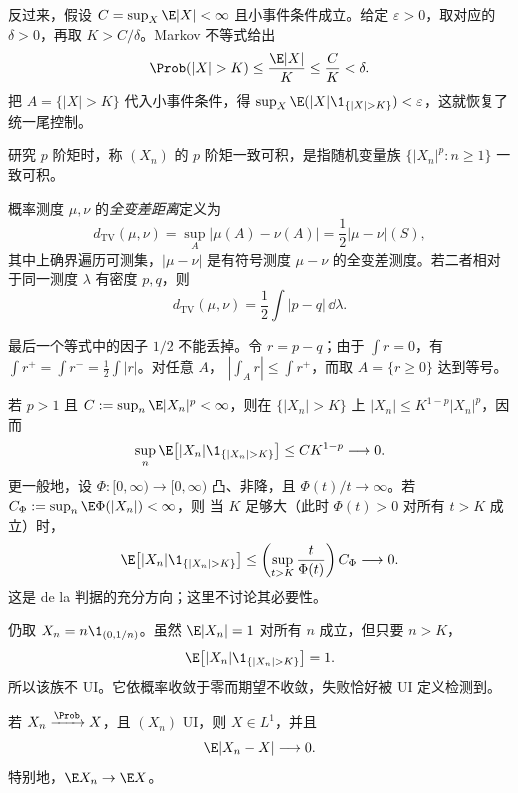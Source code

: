 反过来，假设 $C=\sup_X\E|X|<\infty$ 且小事件条件成立。给定 $\varepsilon>0$，取对应的
$\delta>0$，再取 $K>C/\delta$。Markov 不等式给出
\[
 \Prob(|X|>K)\le\frac{\E|X|}{K}\le\frac CK<\delta.
\]
把 $A=\{|X|>K\}$ 代入小事件条件，得
$\sup_X\E(|X|\1_{\{|X|>K\}})<\varepsilon$，这就恢复了统一尾控制。

\begin{definition}[矩一致可积]\label{def:5-3-2-2}
研究 $p$ 阶矩时，称 $(X_n)$ 的 $p$ 阶矩一致可积，是指随机变量族
$\{|X_n|^p:n\ge1\}$ 一致可积。
\end{definition}

\begin{definition}[全变差距离]\label{def:5-3-2-3}
概率测度 $\mu,\nu$ 的\emph{全变差距离}定义为
\[
 d_{\mathrm{TV}}(\mu,\nu)=\sup_A|\mu(A)-\nu(A)|
 =\frac12|\mu-\nu|(S),
\]
其中上确界遍历可测集，$|\mu-\nu|$ 是有符号测度 $\mu-\nu$ 的全变差测度。若二者相对于同一测度 $\lambda$ 有密度 $p,q$，则
\[
 d_{\mathrm{TV}}(\mu,\nu)=\frac12\int|p-q|\,\dd\lambda.
\]
\end{definition}

最后一个等式中的因子 $1/2$ 不能丢掉。令 $r=p-q$；由于 $\int r=0$，有
$\int r^+=\int r^-=\frac12\int|r|$。对任意 $A$，
$|\int_A r|\le\int r^+$，而取 $A=\{r\ge0\}$ 达到等号。

\begin{example}\label{ex:5-3-2-1}
若 $p>1$ 且 $C:=\sup_n\E|X_n|^p<\infty$，则在 $\{|X_n|>K\}$ 上
$|X_n|\le K^{1-p}|X_n|^p$，因而
\[
 \sup_n\E\bigl[|X_n|\1_{\{|X_n|>K\}}\bigr]
 \le C K^{1-p}\longrightarrow0.
\]
更一般地，设 $\Phi:[0,\infty)\to[0,\infty)$ 凸、非降，且
$\Phi(t)/t\to\infty$。若 $C_\Phi:=\sup_n\E\Phi(|X_n|)<\infty$，则
当 $K$ 足够大（此时 $\Phi(t)>0$ 对所有 $t>K$ 成立）时，
\[
 \E\bigl[|X_n|\1_{\{|X_n|>K\}}\bigr]
 \le \left(\sup_{t>K}\frac{t}{\Phi(t)}\right)C_\Phi\longrightarrow0.
\]
这是 de la \ValleePoussin{} 判据的充分方向；这里不讨论其必要性。
\end{example}

\begin{example}[一致 $L^1$ 有界并不够]\label{ex:5-3-2-2}
仍取 $X_n=n\1_{(0,1/n)}$。虽然 $\E|X_n|=1$ 对所有 $n$ 成立，但只要 $n>K$，
\[
 \E\bigl[|X_n|\1_{\{|X_n|>K\}}\bigr]=1.
\]
所以该族不 UI。它依概率收敛于零而期望不收敛，失败恰好被 UI 定义检测到。
\end{example}

\begin{theorem}\label{theorem:5-3-2-1}
若 $X_n\xrightarrow{\Prob}X$，且 $(X_n)$ UI，则 $X\in L^1$，并且
\[
 \E|X_n-X|\longrightarrow0.
\]
特别地，$\E X_n\to\E X$。
\end{theorem}


